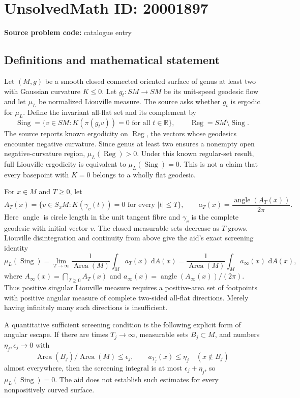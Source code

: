 \documentclass[11pt]{article}
\newcommand{\R}{\mathbb{R}}
\newcommand{\dd}{\,\mathrm{d}}
\begin{document}
\section*{UnsolvedMath ID: 20001897}
\textbf{Source problem code:} catalogue entry
\subsection{Definitions and mathematical statement}
Let \((M,g)\) be a smooth closed connected oriented surface of genus at least two with Gaussian curvature \(K\leq0\). Let \(g_t:SM\to SM\) be its unit-speed geodesic flow and let \(\mu_L\) be normalized Liouville measure. The source asks whether \(g_t\) is ergodic for \(\mu_L\). Define the invariant all-flat set and its complement by
\[
 \operatorname{Sing}=\{v\in SM:K(\pi(g_tv))=0\text{ for all }t\in\R\},
 \qquad\operatorname{Reg}=SM\setminus\operatorname{Sing}.
\]
The source reports known ergodicity on \(\operatorname{Reg}\), the vectors whose geodesics encounter negative curvature. Since genus at least two ensures a nonempty open negative-curvature region, \(\mu_L(\operatorname{Reg})>0\). Under this known regular-set result, full Liouville ergodicity is equivalent to \(\mu_L(\operatorname{Sing})=0\). This is not a claim that every basepoint with \(K=0\) belongs to a wholly flat geodesic.

For \(x\in M\) and \(T\geq0\), let
\[
 A_T(x)=\{v\in S_xM:K(\gamma_v(t))=0\text{ for every }|t|\leq T\},
 \qquad a_T(x)=\frac{\operatorname{angle}(A_T(x))}{2\pi}.
\]
Here \(\operatorname{angle}\) is circle length in the unit tangent fibre and \(\gamma_v\) is the complete geodesic with initial vector \(v\). The closed measurable sets decrease as \(T\) grows. Liouville disintegration and continuity from above give the aid's exact screening identity
\[
 \mu_L(\operatorname{Sing})
 =\lim_{T\to\infty}\frac1{\operatorname{Area}(M)}
      \int_M a_T(x)\,\dd A(x)
 =\frac1{\operatorname{Area}(M)}\int_M a_\infty(x)\,\dd A(x),
\]
where \(A_\infty(x)=\bigcap_{T\geq0}A_T(x)\) and
\(a_\infty(x)=\operatorname{angle}(A_\infty(x))/(2\pi)\).
Thus positive singular Liouville measure requires a positive-area set of footpoints with positive angular measure of complete two-sided all-flat directions. Merely having infinitely many such directions is insufficient.

A quantitative sufficient screening condition is the following explicit form of angular escape. If there are times \(T_j\to\infty\), measurable sets \(B_j\subset M\), and numbers \(\eta_j,\epsilon_j\to0\) with
\[
 \operatorname{Area}(B_j)/\operatorname{Area}(M)\leq\epsilon_j,
 \qquad a_{T_j}(x)\leq\eta_j\quad(x\notin B_j)
\]
almost everywhere, then the screening integral is at most \(\epsilon_j+\eta_j\), so \(\mu_L(\operatorname{Sing})=0\). The aid does not establish such estimates for every nonpositively curved surface.
\end{document}
